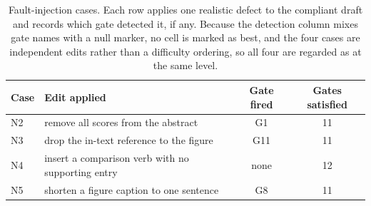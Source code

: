 \begin{table}[t]
\centering
\caption{Fault-injection cases. Each row applies one realistic defect to the compliant draft and records which gate detected it, if any. Because the detection column mixes gate names with a null marker, no cell is marked as best, and the four cases are independent edits rather than a difficulty ordering, so all four are regarded as at the same level.}
\label{tab:fault-cases}
\begin{tabular}{llcc}
\toprule
\textbf{Case} & \textbf{Edit applied} & \textbf{Gate fired} & \textbf{Gates satisfied} \\
\midrule
N2 & remove all scores from the abstract & G1 & 11 \\
N3 & drop the in-text reference to the figure & G11 & 11 \\
N4 & insert a comparison verb with no supporting entry & none & 12 \\
N5 & shorten a figure caption to one sentence & G8 & 11 \\
\bottomrule
\end{tabular}
\par\vspace{2pt}{\footnotesize 'none' denotes a defect the checker does not detect; it is reported rather than repaired, and Section 5.2 explains why.}
\end{table}
